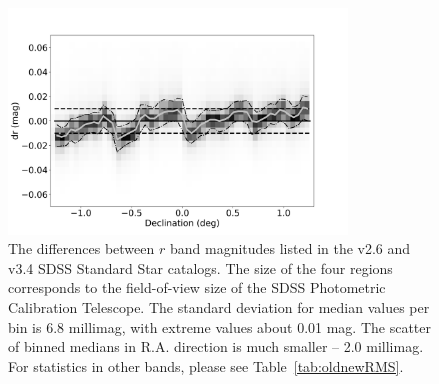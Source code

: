 \begin{figure}
    \centering\includegraphics[width=9cm]{figures/testV26vsV33_r_dr_Dec_Hess.png} 
\caption{The differences between $r$ band magnitudes listed in the v2.6 and v3.4 
    SDSS Standard Star catalogs. The size of the four regions corresponds to the
field-of-view size of the SDSS Photometric Calibration Telescope. The standard 
deviation for median values per bin is 6.8 millimag, with extreme values about 0.01 mag. 
The scatter of binned medians in R.A. direction is much smaller -- 2.0 millimag. 
For statistics in other bands, please see Table~\ref{tab:oldnewRMS}.}
\label{fig:v26v34drDec}
\end{figure}
 

